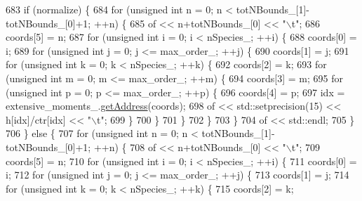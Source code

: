 \begin{DoxyCode}
683     \textcolor{keywordflow}{if} (normalize) \{
684         \textcolor{keywordflow}{for} (\textcolor{keywordtype}{unsigned} \textcolor{keywordtype}{int} n = 0; n < totNBounds\_[1]-totNBounds\_[0]+1; ++n) \{
685             of << n+totNBounds\_[0] << \textcolor{stringliteral}{"\(\backslash\)t"};
686             coords[5] = n;
687             \textcolor{keywordflow}{for} (\textcolor{keywordtype}{unsigned} \textcolor{keywordtype}{int} i = 0; i < nSpecies\_; ++i) \{
688                 coords[0] = i;
689                 \textcolor{keywordflow}{for} (\textcolor{keywordtype}{unsigned} \textcolor{keywordtype}{int} j = 0; j <= max\_order\_; ++j) \{
690                     coords[1] = j;
691                     \textcolor{keywordflow}{for} (\textcolor{keywordtype}{unsigned} \textcolor{keywordtype}{int} k = 0; k < nSpecies\_; ++k) \{
692                         coords[2] = k;
693                         \textcolor{keywordflow}{for} (\textcolor{keywordtype}{unsigned} \textcolor{keywordtype}{int} m = 0; m <= max\_order\_; ++m) \{
694                             coords[3] = m;
695                             \textcolor{keywordflow}{for} (\textcolor{keywordtype}{unsigned} \textcolor{keywordtype}{int} p = 0; p <= max\_order\_; ++p) \{
696                                 coords[4] = p;
697                                 idx = extensive\_moments\_.\hyperlink{classhistogram_ae52fa58934b56e05846a66e43c3184bd}{getAddress}(coords);
698                                 of << std::setprecision(15) << h[idx]/ctr[idx] << \textcolor{stringliteral}{"\(\backslash\)t"};
699                             \}
700                         \}
701                     \}
702                 \}
703             \}
704             of << std::endl;
705         \}
706     \} \textcolor{keywordflow}{else} \{
707         \textcolor{keywordflow}{for} (\textcolor{keywordtype}{unsigned} \textcolor{keywordtype}{int} n = 0; n < totNBounds\_[1]-totNBounds\_[0]+1; ++n) \{
708             of << n+totNBounds\_[0] << \textcolor{stringliteral}{"\(\backslash\)t"};
709             coords[5] = n;
710             \textcolor{keywordflow}{for} (\textcolor{keywordtype}{unsigned} \textcolor{keywordtype}{int} i = 0; i < nSpecies\_; ++i) \{
711                 coords[0] = i;
712                 \textcolor{keywordflow}{for} (\textcolor{keywordtype}{unsigned} \textcolor{keywordtype}{int} j = 0; j <= max\_order\_; ++j) \{
713                     coords[1] = j;
714                     \textcolor{keywordflow}{for} (\textcolor{keywordtype}{unsigned} \textcolor{keywordtype}{int} k = 0; k < nSpecies\_; ++k) \{
715                         coords[2] = k;

\end{DoxyCode}
